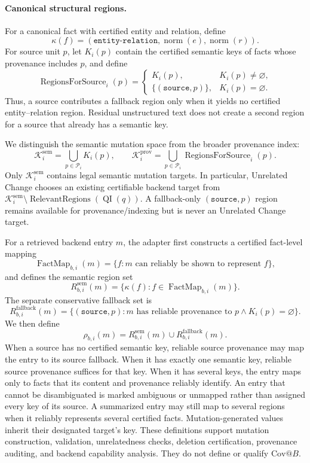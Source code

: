 \paragraph{Canonical structural regions.}
For a canonical fact with certified entity and relation, define
\[
\kappa(f)=(\texttt{entity-relation},\operatorname{norm}(e),
\operatorname{norm}(r)).
\]
For source unit \(p\), let \(K_i(p)\) contain the certified semantic keys of
facts whose provenance includes \(p\), and define
\begin{equation}
\operatorname{RegionsForSource}_i(p)=
\begin{cases}
K_i(p), & K_i(p)\neq\varnothing,\\
\{(\texttt{source},p)\}, & K_i(p)=\varnothing.
\end{cases}
\label{eq:source-regions}
\end{equation}
Thus, a source contributes a fallback region only when it yields no certified
entity--relation region. Residual unstructured text does not create a second
region for a source that already has a semantic key.

We distinguish the semantic mutation space from the broader provenance index:
\[
\mathcal{K}^{\mathrm{sem}}_i=\bigcup_{p\in\mathcal{P}_i}K_i(p),
\qquad
\mathcal{K}^{\mathrm{prov}}_i=
\bigcup_{p\in\mathcal{P}_i}\operatorname{RegionsForSource}_i(p).
\]
Only \(\mathcal{K}^{\mathrm{sem}}_i\) contains legal semantic mutation
targets. In particular, Unrelated Change chooses an existing certifiable
backend target from
\(\mathcal{K}^{\mathrm{sem}}_i\setminus
\operatorname{RelevantRegions}(\operatorname{QI}(q))\). A fallback-only
\((\texttt{source},p)\) region remains available for provenance/indexing but
is never an Unrelated Change target.

For a retrieved backend entry \(m\), the adapter first constructs a certified
fact-level mapping
\[
\operatorname{FactMap}_{b,i}(m)=
\{f:m\text{ can reliably be shown to represent }f\},
\]
and defines the semantic region set
\[
R^{\mathrm{sem}}_{b,i}(m)=
\{\kappa(f):f\in\operatorname{FactMap}_{b,i}(m)\}.
\]
The separate conservative fallback set is
\[
R^{\mathrm{fallback}}_{b,i}(m)=
\{(\texttt{source},p):m\text{ has reliable provenance to }p
\land K_i(p)=\varnothing\}.
\]
We then define
\[
\rho_{b,i}(m)=R^{\mathrm{sem}}_{b,i}(m)\cup
R^{\mathrm{fallback}}_{b,i}(m).
\]
When a source has no certified semantic key, reliable source provenance may
map the entry to its source fallback. When it has exactly one semantic key,
reliable source provenance suffices for that key. When it has several keys,
the entry maps only to facts that its content and provenance reliably
identify. An entry that cannot be disambiguated is marked ambiguous or
unmapped rather than assigned every key of its source. A
summarized entry may still map to several regions when it reliably represents
several certified facts. Mutation-generated values inherit their designated
target's key. These definitions support mutation construction, validation,
unrelatedness checks, deletion certification, provenance auditing, and backend
capability analysis. They do not define or qualify \(\mathrm{Cov}@B\).

